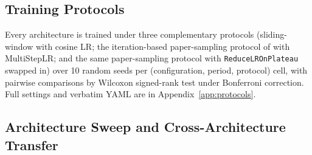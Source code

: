 \documentclass{article}
\begin{document}
\begin{table}[h]
  \caption{Datasets and evaluation parameters. The paper-sample protocol enforces the in-sample constraint $L_h \cdot H$~\citep[Appendix~D]{oreshkin2020nbeats} on the trailing window of each series, with $L_h = 1.5$ for Yearly/Quarterly and $L_h = 10$ otherwise.}
  \label{tab:datasets}
  \centering
\end{table}

\subsection{Training Protocols}

Every architecture is trained under three complementary protocols (sliding-window with cosine LR; the iteration-based paper-sampling protocol of \citet{oreshkin2020nbeats} with MultiStepLR; and the same paper-sampling protocol with \texttt{ReduceLROnPlateau} swapped in) over 10 random seeds per (configuration, period, protocol) cell, with pairwise comparisons by Wilcoxon signed-rank test under Bonferroni correction. Full settings and verbatim YAML are in Appendix~\ref{app:protocols}.

\subsection{Architecture Sweep and Cross-Architecture Transfer}
\end{document}
